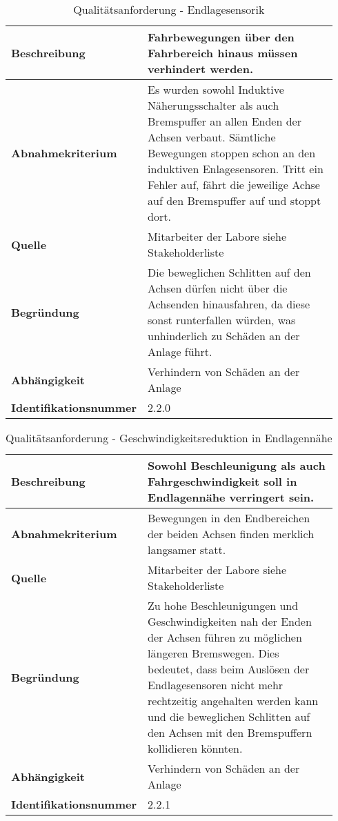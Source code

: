 \documentclass[../../../Bachelorarbeit.tex]{subfiles}
\begin{document}
\begin{table}[H]
    \centering
    \begin{tabular}{| p{0.34\linewidth} | p{0.6\linewidth} |}
        \hline
        \textbf{Beschreibung} & Fahrbewegungen über den Fahrbereich hinaus müssen verhindert werden. \\ \hline
        \textbf{Abnahmekriterium} & Es wurden sowohl Induktive Näherungsschalter als auch Bremspuffer an allen Enden der Achsen verbaut. Sämtliche Bewegungen stoppen schon an den induktiven Enlagesensoren. Tritt ein Fehler auf, fährt die jeweilige Achse auf den Bremspuffer auf und stoppt dort. \\ \hline
        \textbf{Quelle} & Mitarbeiter der Labore siehe Stakeholderliste \\ \hline
        \textbf{Begründung} & Die beweglichen Schlitten auf den Achsen dürfen nicht über die Achsenden hinausfahren, da diese sonst runterfallen würden, was unhinderlich zu Schäden an der Anlage führt. \\ \hline
        \textbf{Abhängigkeit} & Verhindern von Schäden an der Anlage \\ \hline
        \textbf{Identifikationsnummer} & 2.2.0 \\ \hline
    \end{tabular}
    \caption[\acs{nfa} - Endlagesensorik]{Qualitätsanforderung - Endlagesensorik}
    \label{tab:my-table20}
\end{table}

\begin{table}[H]
    \centering
    \begin{tabular}{| p{0.34\linewidth} | p{0.6\linewidth} |}
        \hline
        \textbf{Beschreibung} & Sowohl Beschleunigung als auch Fahrgeschwindigkeit soll in Endlagennähe verringert sein. \\ \hline
        \textbf{Abnahmekriterium} & Bewegungen in den Endbereichen der beiden Achsen finden merklich langsamer statt. \\ \hline
        \textbf{Quelle} & Mitarbeiter der Labore siehe Stakeholderliste \\ \hline
        \textbf{Begründung} & Zu hohe Beschleunigungen und Geschwindigkeiten nah der Enden der Achsen führen zu möglichen längeren Bremswegen. Dies bedeutet, dass beim Auslösen der Endlagesensoren nicht mehr rechtzeitig angehalten werden kann und die beweglichen Schlitten auf den Achsen mit den Bremspuffern kollidieren könnten. \\ \hline
        \textbf{Abhängigkeit} & Verhindern von Schäden an der Anlage \\ \hline
        \textbf{Identifikationsnummer} & 2.2.1 \\ \hline
    \end{tabular}
    \caption[\acs{nfa} - Geschwindigkeitsreduktion in Endlagennähe]{Qualitätsanforderung - Geschwindigkeitsreduktion in Endlagennähe}
    \label{tab:my-table21}
\end{table}
\end{document}
